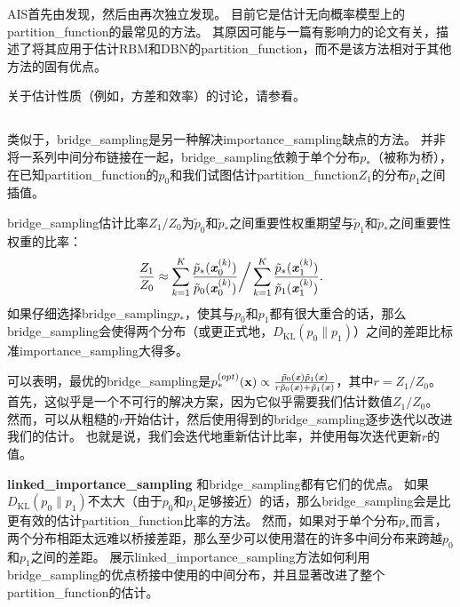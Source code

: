 
\gls{AIS}首先由\cite{Jarzynski1997}发现，然后由\cite{Neal-2001}再次独立发现。
目前它是估计无向概率模型上的\gls{partition_function}的最常见的方法。
其原因可能与一篇有影响力的论文\citep{Salakhutdinov+Murray-2008}有关，描述了将其应用于估计\gls{RBM}和\gls{DBN}的\gls{partition_function}，而不是该方法相对于其他方法的固有优点。


关于估计性质（例如，方差和效率）的讨论，请参看\cite{Neal-2001}。


\subsection{}
\label{sec:bridge_sampling}
类似于，\gls{bridge_sampling}\citep{Bennet76}是另一种解决\gls{importance_sampling}缺点的方法。
并非将一系列中间分布链接在一起，\gls{bridge_sampling}依赖于单个分布$p_*$（被称为桥），在已知\gls{partition_function}的$p_0$和我们试图估计\gls{partition_function}$Z_1$的分布$p_1$之间插值。


\gls{bridge_sampling}估计比率$Z_1 / Z_0$为$\tilde{p}_0$和$\tilde{p}_*$之间重要性权重期望与$\tilde{p}_1$和$\tilde{p}_*$之间重要性权重的比率：
\begin{equation}
	\frac{Z_1}{ Z_0} \approx \sum_{k=1}^K \frac{ \tilde{p}_*(\boldsymbol{\mathit{x}}_0^{(k)}) }{ \tilde{p}_0(\boldsymbol{\mathit{x}}_0^{(k)}) } \bigg/ \sum_{k=1}^K \frac{ \tilde{p}_*(\boldsymbol{\mathit{x}}_1^{(k)}) }{ \tilde{p}_1(\boldsymbol{\mathit{x}}_1^{(k)}) } .
\end{equation}
如果仔细选择\gls{bridge_sampling}$p_*$，使其与$p_0$和$p_1$都有很大重合的话，那么\gls{bridge_sampling}会使得两个分布（或更正式地，$D_{\text{KL}}(p_0 \| p_1)$）之间的差距比标准\gls{importance_sampling}大得多。


可以表明，最优的\gls{bridge_sampling}是$p_*^{(opt)} (\mathbf{x}) \propto \frac{ \tilde{p}_0(\boldsymbol{\mathit{x}}) \tilde{p}_1(\boldsymbol{\mathit{x}}) }{ r\tilde{p}_0(\boldsymbol{\mathit{x}}) + \tilde{p}_1(\boldsymbol{\mathit{x}}) }$，其中$r = Z_1 / Z_0$。
首先，这似乎是一个不可行的解决方案，因为它似乎需要我们估计数值$Z_1 / Z_0$。
然而，可以从粗糙的$r$开始估计，然后使用得到的\gls{bridge_sampling}逐步迭代以改进我们的估计\citep{Neal05estimatingratios}。
也就是说，我们会迭代地重新估计比率，并使用每次迭代更新$r$的值。


\textbf{\gls{linked_importance_sampling}}
和\gls{bridge_sampling}都有它们的优点。
如果$D_{\text{KL}}(p_0 \| p_1)$不太大（由于$p_0$和$p_1$足够接近）的话，那么\gls{bridge_sampling}会是比更有效的估计\gls{partition_function}比率的方法。
然而，如果对于单个分布$p_*$而言，两个分布相距太远难以桥接差距，那么至少可以使用潜在的许多中间分布来跨越$p_0$和$p_1$之间的差距。
\cite{Neal05estimatingratios}展示\gls{linked_importance_sampling}方法如何利用\gls{bridge_sampling}的优点桥接中使用的中间分布，并且显著改进了整个\gls{partition_function}的估计。


